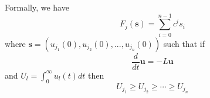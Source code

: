 \documentclass[10pt]{article}
\theoremstyle{definition}
\numberwithin{theorem}{section}
\numberwithin{definition}{section}
\numberwithin{lemma}{section}
\numberwithin{corollary}{section}
\numberwithin{clm}{section}
\numberwithin{rmk}{section}
\renewcommand{\b}{\bm}
\begin{document}
Formally, we have
\[
F_j(\b{s}) = \sum_{i=0}^{n-1} c^i s_i
\]
where $\b{s} = (u_{j_1}(0),u_{j_2}(0),...,u_{j_n}(0))$ such that if 
\[
\frac{d}{dt}\b{u} = -L\b{u}
\]
and $U_l = \int_0^{\infty} u_l(t) dt$ then
\[
U_{j_1} \geq U_{j_2} \geq \cdots \geq U_{j_n}
\]




\end{document}
